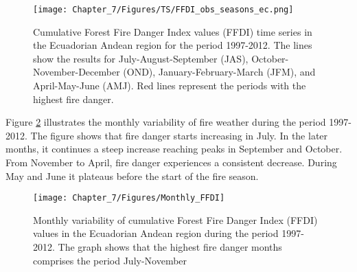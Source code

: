 \begin{figure}[h]
\noindent \begin{centering}
\texttt{[image: Chapter\_7/Figures/TS/FFDI\_obs\_seasons\_ec.png]}
\par\end{centering}

\caption[Cumulative Forest Fire Danger Index values (FFDI) time series in the
Ecuadorian Andean region for the period 1997-2012]{Cumulative Forest Fire Danger Index values (FFDI) time series in the
Ecuadorian Andean region for the period 1997-2012. The lines show
the results for July-August-September (JAS), October-November-December
(OND), January-February-March (JFM), and April-May-June (AMJ). Red
lines represent the periods with the highest fire danger. \label{fig:Cumulative Forest Fire Danger Index values (FFDI) time series in the Ecuadorian andean region for the period 1997-2012}}
\end{figure}


Figure \ref{fig:Monthly variability of cumulative Forest Fire Danger Index (FFDI) values in the Ecuadorian andean region during the period 1997-2012}
illustrates the monthly variability of fire weather during the period
1997-2012. The figure shows that fire danger starts increasing in
July. In the later months, it continues a steep increase reaching
peaks in September and October. From November to April, fire danger
experiences a consistent decrease. During May and June it plateaus
before the start of the fire season. 

\begin{figure}[h]
\noindent \begin{centering}
\texttt{[image: Chapter\_7/Figures/Monthly\_FFDI]}
\par\end{centering}

\caption[Monthly variability of cumulative Forest Fire Danger Index (FFDI)
values in the Ecuadorian Andean region during the period 1997-2012]{Monthly variability of cumulative Forest Fire Danger Index (FFDI)
values in the Ecuadorian Andean region during the period 1997-2012.
The graph shows that the highest fire danger months comprises the
period July-November \label{fig:Monthly variability of cumulative Forest Fire Danger Index (FFDI) values in the Ecuadorian andean region during the period 1997-2012} }
\end{figure}


